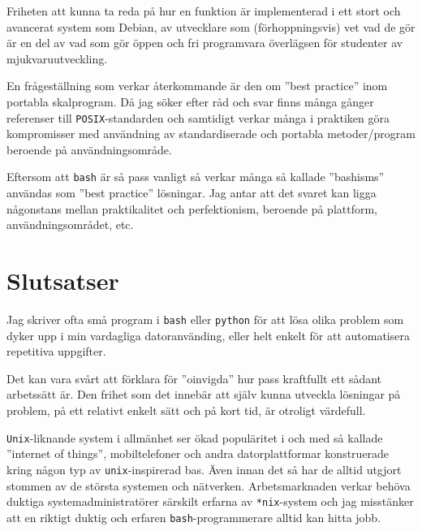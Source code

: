 Friheten att kunna ta reda på hur en funktion är implementerad i ett stort och
avancerat system som Debian, av utvecklare som (förhoppningsvis) vet vad de gör
är en del av vad som gör öppen och fri programvara överlägsen för studenter av
mjukvaruutveckling.

En frågeställning som verkar återkommande är den om ''best practice'' inom
portabla skalprogram. Då jag söker efter råd och svar finns många gånger
referenser till \texttt{POSIX}-standarden \cite{IEEE:2001:ISRa}
\cite{IEEE:2001:ISRb} \cite{IEEE:2001:ISRc} \cite{IEEE:2001:ISRd} och samtidigt
verkar många i praktiken göra kompromisser med användning av standardiserade
och portabla metoder/program beroende på användningsområde.

Eftersom att \texttt{bash} är så pass vanligt så verkar många så kallade
''bashisms'' \cite{misc:bashism} användas som ''best practice'' lösningar. Jag
antar att det svaret kan ligga någonstans mellan praktikalitet och
perfektionism, beroende på plattform, användningsområdet, etc.


\section{Slutsatser}
Jag skriver ofta små program i \texttt{bash} eller \texttt{python} för att lösa
olika problem som dyker upp i min vardagliga datoranvänding, eller helt enkelt
för att automatisera repetitiva uppgifter. 

Det kan vara svårt att förklara för ''oinvigda'' hur pass kraftfullt ett sådant
arbetssätt är.  Den frihet som det innebär att själv kunna utveckla lösningar
på problem, på ett relativt enkelt sätt och på kort tid, är otroligt värdefull. 

\texttt{Unix}-liknande system i allmänhet ser ökad populäritet i och med så
kallade ''internet of things'', mobiltelefoner och andra datorplattformar
konstruerade kring någon typ av \texttt{unix}-inspirerad bas. Även innan det så
har de alltid utgjort stommen av de största systemen och nätverken.
Arbetsmarknaden verkar behöva duktiga systemadministratörer särskilt erfarna av
\texttt{*nix}-system och jag misstänker att en riktigt duktig och erfaren
\texttt{bash}-programmerare alltid kan hitta jobb.
